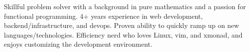 

\begin{cvparagraph}

Skillful problem solver with a background in pure mathematics and a passion for
  functional programming.  4+ years experience in web development,
  backend/infrastructure, and devops.  Proven ability to quickly ramp up on new
  languages/technologies.  Efficiency nerd who loves Linux, vim, and xmonad,
  and enjoys customizing the development environment.
\end{cvparagraph}

